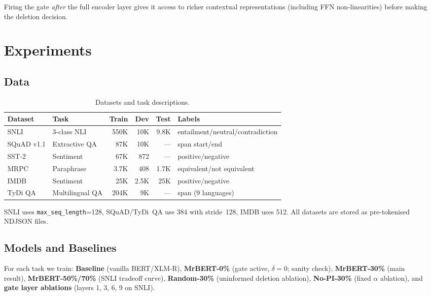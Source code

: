 \documentclass[11pt,a4paper]{article}
\begin{document}
Firing the gate \emph{after} the full encoder layer gives it access to richer contextual representations (including FFN non-linearities) before making the deletion decision.


\section{Experiments}
\label{sec:experiments}

\subsection{Data}

\begin{table}[h]
\centering\small
\begin{tabular}{@{}llrrrL{4cm}@{}}
\toprule
\textbf{Dataset} & \textbf{Task} & \textbf{Train} & \textbf{Dev} & \textbf{Test} & \textbf{Labels} \\
\midrule
SNLI       & 3-class NLI          & 550K  & 10K  & 9.8K & entailment/neutral/contradiction \\
SQuAD v1.1 & Extractive QA        & 87K   & 10K  & ---  & span start/end \\
SST-2      & Sentiment            & 67K   & 872  & ---  & positive/negative \\
MRPC       & Paraphrase           & 3.7K  & 408  & 1.7K & equivalent/not equivalent \\
IMDB       & Sentiment            & 25K   & 2.5K & 25K  & positive/negative \\
TyDi QA   & Multilingual QA      & 204K  & 9K   & ---  & span (9 languages) \\
\bottomrule
\end{tabular}
\caption{Datasets and task descriptions.}
\label{tab:datasets}
\end{table}

SNLI uses \texttt{max\_seq\_length}=128, SQuAD/TyDi~QA use 384 with stride~128, IMDB uses 512. All datasets are stored as pre-tokenised NDJSON files.


\subsection{Models and Baselines}

For each task we train: \textbf{Baseline} (vanilla BERT/XLM-R), \textbf{MrBERT-0\%} (gate active, $\delta=0$; sanity check), \textbf{MrBERT-30\%} (main result), \textbf{MrBERT-50\%/70\%} (SNLI tradeoff curve), \textbf{Random-30\%} (uninformed deletion ablation), \textbf{No-PI-30\%} (fixed $\alpha$ ablation), and \textbf{gate layer ablations} (layers 1, 3, 6, 9 on SNLI).
\end{document}
